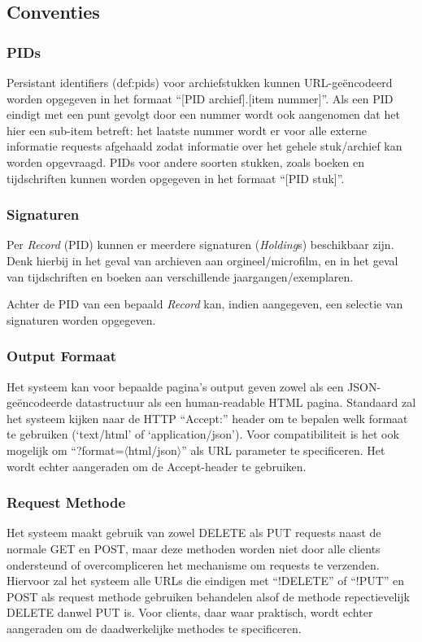 \documentclass[a4paper,titlepage]{report}
\begin{document}
    \subsection{Conventies}
      \subsubsection{PIDs}
        Persistant identifiers (\glspl{def:pid}) voor archiefstukken kunnen
        URL-ge\"encodeerd worden
        opgegeven in het formaat ``[PID
        archief].[item nummer]''. Als een PID eindigt met een punt gevolgt
        door een nummer wordt ook aangenomen dat het hier een sub-item
        betreft: het laatste nummer wordt er voor alle externe informatie
        requests afgehaald zodat informatie over het gehele stuk/archief kan
        worden opgevraagd. PIDs voor andere soorten stukken, zoals boeken en
        tijdschriften kunnen worden opgegeven in het formaat ``[PID stuk]''.
      
      \subsubsection{Signaturen}
        Per \emph{Record} (PID) kunnen er meerdere signaturen (\emph{Holding}s) beschikbaar zijn. Denk
        hierbij in het geval van archieven aan orgineel/microfilm, en in het
        geval van tijdschriften en boeken aan verschillende jaargangen/exemplaren. 

        Achter de PID van een bepaald \emph{Record} kan, indien aangegeven, een selectie van
        signaturen worden opgegeven.

      \subsubsection{Output Formaat}
        Het systeem kan voor bepaalde pagina's output geven zowel als een
        JSON-ge\"encodeerde datastructuur als een human-readable HTML pagina.
        Standaard zal het systeem kijken naar de HTTP ``Accept:'' header om te
        bepalen welk formaat te gebruiken (`text/html' of `application/json').
        Voor compatibiliteit is het ook mogelijk om
        ``?format=$\langle$html/json$\rangle$'' als URL parameter te
        specificeren. Het wordt echter aangeraden om de Accept-header te
        gebruiken.

      \subsubsection{Request Methode}
        Het systeem maakt gebruik van zowel DELETE als PUT requests naast de
        normale GET en POST, maar deze methoden worden niet door alle clients
        ondersteund of overcompliceren het mechanisme om requests te
        verzenden. Hiervoor zal het systeem alle URLs die eindigen met
        ``!DELETE'' of ``!PUT'' en POST als request methode gebruiken
        behandelen alsof de methode repectievelijk DELETE danwel PUT is. Voor
        clients, daar waar praktisch, wordt echter aangeraden om de
        daadwerkelijke methodes te specificeren.
\end{document}
